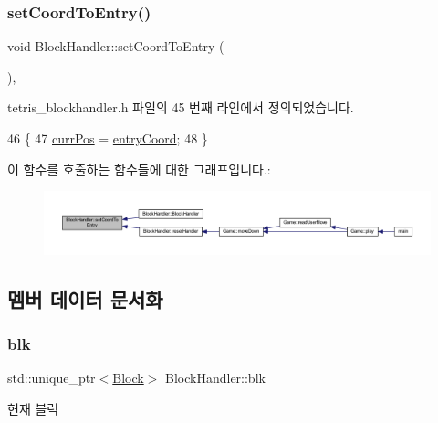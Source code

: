 \subsubsection{\texorpdfstring{set\+Coord\+To\+Entry()}{setCoordToEntry()}}
{\footnotesize\ttfamily void Block\+Handler\+::set\+Coord\+To\+Entry (\begin{DoxyParamCaption}{ }\end{DoxyParamCaption})\hspace{0.3cm}{\ttfamily [inline]}, {\ttfamily [private]}}



tetris\+\_\+blockhandler.\+h 파일의 45 번째 라인에서 정의되었습니다.


\begin{DoxyCode}
46     \{
47         \mbox{\hyperlink{class_block_handler_a11bd634fdc179446f9c6751e2394999e}{currPos}} = \mbox{\hyperlink{class_block_handler_a5a2b1799763c46ced8a197775ca13fa7}{entryCoord}};
48     \}
\end{DoxyCode}
이 함수를 호출하는 함수들에 대한 그래프입니다.\+:
\nopagebreak
\begin{figure}[H]
\begin{center}
\leavevmode
\includegraphics[width=350pt]{class_block_handler_aa0143a5722a52a91357c184354d484a6_icgraph}
\end{center}
\end{figure}


\subsection{멤버 데이터 문서화}
\mbox{\label{class_block_handler_ab57212ded2552ab5559d278c8538c454}} 
\subsubsection{\texorpdfstring{blk}{blk}}
{\footnotesize\ttfamily std\+::unique\+\_\+ptr$<$\mbox{\hyperlink{class_block}{Block}}$>$ Block\+Handler\+::blk}



현재 블럭 



